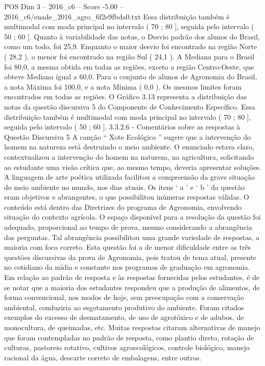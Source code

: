 \begin{textsample}{POS Dim 3 – 2016\_c6 – Score -5.00 – 2016\_c6/enade\_2016\_agro\_6f2e9fbda0.txt}
Essa distribuição também é multimodal com moda principal no intervalo ( 70 ; 80 ], seguida pelo intervalo ( 50 ; 60 ].
Quanto à variabilidade das notas, o Desvio padrão dos alunos do Brasil, como um todo, foi 25,9.
Enquanto o maior desvio foi encontrado na região Norte ( 28,2 ), o menor foi encontrado na região Sul ( 24,1 ).
A Mediana para o Brasil foi 80,0, a mesma obtida em todas as regiões, exceto a região Centro-Oeste, que obteve Mediana igual a 60,0.
Para o conjunto de alunos de Agronomia do Brasil, a nota Máxima foi 100,0, e a nota Mínima ( 0,0 ).
Os mesmos limites foram encontrados em todas as regiões.
O Gráfico 3.13 representa a distribuição das notas da questão discursiva 5 do Componente de Conhecimento Específico.
Essa distribuição também é multimodal com moda principal no intervalo ( 70 ; 80 ], seguida pelo intervalo ( 50 ; 60 ]. 3.3.2.6 - Comentários sobre as respostas à Questão Discursiva 5 A canção “ Xote Ecológico ” sugere que a intervenção do homem na natureza está destruindo o meio ambiente.
O enunciado estava claro, contextualizou a intervenção do homem na natureza, na agricultura, solicitando ao estudante uma visão crítica que, ao mesmo tempo, deveria apresentar soluções.
A linguagem de arte poética utilizada facilitou a compreensão da grave situação do meio ambiente no mundo, nos dias atuais.
Os itens ‘ a ’ e ‘ b ’ da questão eram objetivos e abrangentes, o que possibilitou inúmeras respostas válidas.
O conteúdo está dentro das Diretrizes do programa de Agronomia, envolvendo situação do contexto agrícola.
O espaço disponível para a resolução da questão foi adequado, proporcional ao tempo de prova, mesmo considerando a abrangência das perguntas.
Tal abrangência possibilitou uma grande variedade de respostas, a maioria com foco correto.
Esta questão foi a de menor dificuldade entre as três questões discursivas da prova de Agronomia, pois tratou de tema atual, presente no cotidiano da mídia e constante nos programas de graduação em agronomia.
Em relação ao padrão de resposta e às respostas fornecidas pelos estudantes, é de se notar que a maioria dos estudantes respondeu que a produção de alimentos, de forma convencional, nos modos de hoje, sem preocupação com a conservação ambiental, conduziria ao esgotamento produtivo do ambiente.
Foram citados exemplos do excesso de desmatamento, de uso de agrotóxico e de adubos, de monocultura, de queimadas, etc.
Muitas respostas citaram alternativas de manejo que foram contempladas no padrão de resposta, como plantio direto, rotação de culturas, pastoreio rotativo, cultivos agroecológicos, controle biológico, manejo racional da água, descarte correto de embalagens, entre outros.

\end{textsample}
